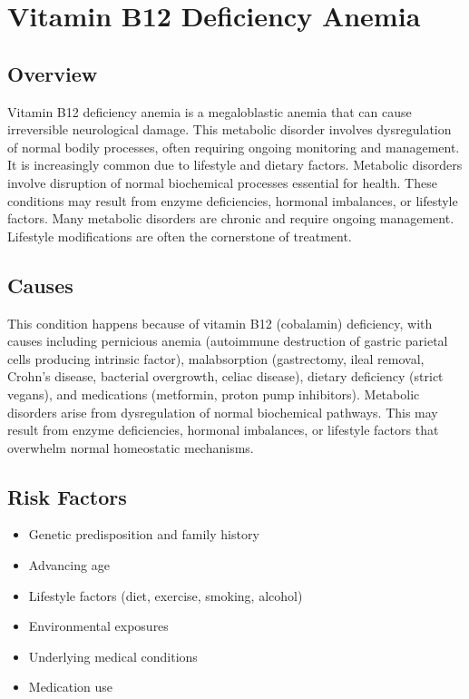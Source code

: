 \chapter{Vitamin B12 Deficiency Anemia}
\label{sec:Vitamin B12 Deficiency Anemia}

\section{Overview}
Vitamin B12 deficiency anemia is a megaloblastic anemia that can cause irreversible neurological damage. This metabolic disorder involves dysregulation of normal bodily processes, often requiring ongoing monitoring and management. It is increasingly common due to lifestyle and dietary factors. Metabolic disorders involve disruption of normal biochemical processes essential for health. These conditions may result from enzyme deficiencies, hormonal imbalances, or lifestyle factors. Many metabolic disorders are chronic and require ongoing management. Lifestyle modifications are often the cornerstone of treatment.
\section{Causes}
This condition happens because of vitamin B12 (cobalamin) deficiency, with causes including pernicious anemia (autoimmune destruction of gastric parietal cells producing intrinsic factor), malabsorption (gastrectomy, ileal removal, Crohn's disease, bacterial overgrowth, celiac disease), dietary deficiency (strict vegans), and medications (metformin, proton pump inhibitors). Metabolic disorders arise from dysregulation of normal biochemical pathways. This may result from enzyme deficiencies, hormonal imbalances, or lifestyle factors that overwhelm normal homeostatic mechanisms.   
\section{Risk Factors}
\begin{itemize}[noitemsep]
  \item Genetic predisposition and family history
  \item Advancing age
  \item Lifestyle factors (diet, exercise, smoking, alcohol)
  \item Environmental exposures
  \item Underlying medical conditions
  \item Medication use
\end{itemize}

